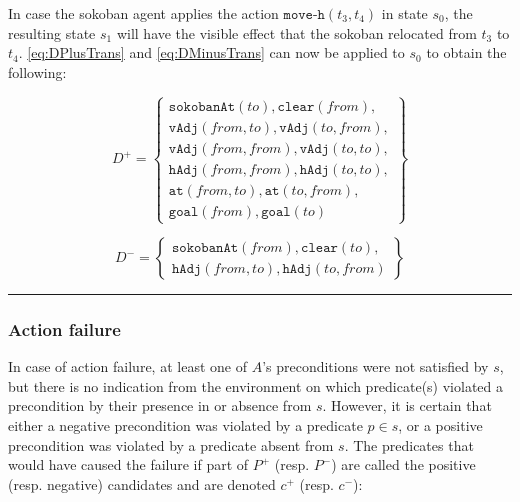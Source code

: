 \documentclass[../Master.tex]{subfiles}
\begin{document}
\begin{example} \label{ex:moveSucceeded}
In case the sokoban agent applies the action $\texttt{move-h}(t_3, t_4)$ in state $s_0$, the resulting state $s_1$ will have the visible effect that the sokoban relocated from $t_3$ to $t_4$. \eqref{eq:DPlusTrans} and \eqref{eq:DMinusTrans} can now be applied to $s_0$ to obtain the following:

\begin{equation*}
    D^+ = \left\{
        \begin{gathered}
            \texttt{sokobanAt}(to), \texttt{clear}(from), \\
            \texttt{vAdj}(from, to), \texttt{vAdj}(to, from), \\
            \texttt{vAdj}(from, from), \texttt{vAdj}(to, to), \\
            \texttt{hAdj}(from, from), \texttt{hAdj}(to, to), \\
            \texttt{at}(from, to), \texttt{at}(to, from), \\
            \texttt{goal}(from), \texttt{goal}(to)
        \end{gathered}
    \right\}
\end{equation*}

\begin{equation*}
    D^- = \left\{
        \begin{gathered}
            \texttt{sokobanAt}(from), \texttt{clear}(to), \\
            \texttt{hAdj}(from, to), \texttt{hAdj}(to, from)
        \end{gathered}
    \right\}
\end{equation*}

\noindent\rule{\textwidth}{1pt}
\end{example}

\subsubsection*{Action failure}
In case of action failure, at least one of $A$'s preconditions were not satisfied by $s$, but there is no indication from the environment on which predicate(s) violated a precondition by their presence in or absence from $s$. However, it is certain that either a negative precondition was violated by a predicate $p \in s$, or a positive precondition was violated by a predicate absent from $s$. The predicates that would have caused the failure if part of $P^+$ (resp. $P^-$) are called the positive (resp. negative) candidates and are denoted $c^+$ (resp. $c^-$):
\end{document}
